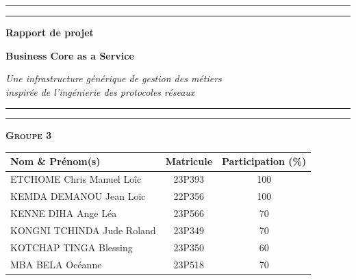 \documentclass[11pt,a4paper,oneside]{report}
\begin{document}
\begin{titlepage}
	{\color{bcblue}\rule{\linewidth}{1.2pt}}
	\vspace{0.1cm}
	{\color{enspyorange}\rule{\linewidth}{0.5pt}}
	
	\vspace{0.3cm}
	
	\begin{center}
		{\Large \bfseries \color{bcblue} Rapport de projet}
		
	
		{\sffamily\bfseries\color{enspyorange}\fontsize{34}{38}\selectfont Business Core as a Service\par}
		\vspace{0.1cm} 
		{ \itshape \color{gray!60} Une infrastructure générique de gestion des métiers\\[0.05cm]
			inspirée de l'ingénierie des protocoles réseaux}
	\end{center}
	
	{\color{enspyorange}\rule{\linewidth}{0.5pt}}
	\vspace{0.1cm}
	{\color{bcblue}\rule{\linewidth}{1.2pt}}
	
	\vspace{0.3cm}
	
	\begin{center}
		{\large \bfseries \color{enspyorange} \textsc{Groupe 3}}
	\end{center}
	
	\vspace{0.1cm}
	
	\begin{center} 
		\vspace{0.15cm}
		\renewcommand{\arraystretch}{1.15}
		\begin{tabular}{l c c}
			\toprule[0.6pt]
			\textbf{Nom \& Prénom(s)} & \textbf{Matricule} & \textbf{Participation (\%)} \\
			\midrule
			ETCHOME Chris Manuel Loîc                 & 23P393 & 100 \\
			KEMDA DEMANOU Jean Loïc        & 22P356 & 100 \\
			KENNE DIHA Ange Léa            & 23P566 & 70\\
			
			KONGNI TCHINDA Jude Roland     & 23P349 & 70\\
            KOTCHAP TINGA Blessing         & 23P350 & 60 \\
			MBA BELA Océanne               & 23P518 & 70 \\
            

\end{tabular}
\end{center}
\end{titlepage}
\end{document}
